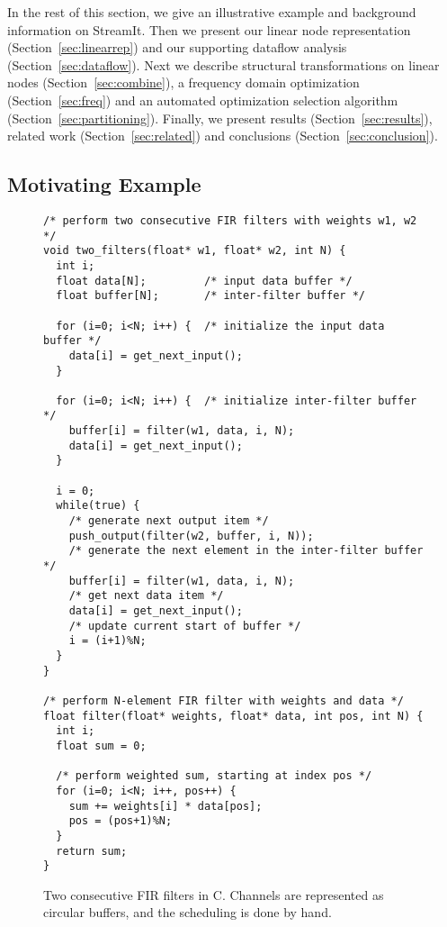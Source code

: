 In the rest of this section, we give an illustrative example and
background information on StreamIt.  Then we present our linear
node representation (Section~\ref{sec:linearrep}) and our 
supporting dataflow analysis (Section~\ref{sec:dataflow}).  
Next we describe structural transformations on linear nodes 
(Section~\ref{sec:combine}), a frequency domain optimization 
(Section~\ref{sec:freq}) and an automated optimization selection 
algorithm (Section~\ref{sec:partitioning}). Finally, we
present results (Section~\ref{sec:results}), related work
(Section~\ref{sec:related}) and conclusions
(Section~\ref{sec:conclusion}).

\subsection{Motivating Example}
\begin{figure}[t]
\vspace{-6pt}
\center
\epsfxsize=3.0in
\vspace{-5pt}
\caption{Block diagram of two FIR filters.}
\label{fig:motivating-fig}
\scriptsize
\begin{verbatim}
/* perform two consecutive FIR filters with weights w1, w2 */
void two_filters(float* w1, float* w2, int N) {
  int i;
  float data[N];         /* input data buffer */
  float buffer[N];       /* inter-filter buffer */
  
  for (i=0; i<N; i++) {  /* initialize the input data buffer */
    data[i] = get_next_input();
  }
  
  for (i=0; i<N; i++) {  /* initialize inter-filter buffer */
    buffer[i] = filter(w1, data, i, N);
    data[i] = get_next_input();
  }
  
  i = 0;
  while(true) {
    /* generate next output item */
    push_output(filter(w2, buffer, i, N));
    /* generate the next element in the inter-filter buffer */
    buffer[i] = filter(w1, data, i, N);
    /* get next data item */
    data[i] = get_next_input();
    /* update current start of buffer */
    i = (i+1)%N;
  }
}

/* perform N-element FIR filter with weights and data */
float filter(float* weights, float* data, int pos, int N) {
  int i;
  float sum = 0;

  /* perform weighted sum, starting at index pos */
  for (i=0; i<N; i++, pos++) {
    sum += weights[i] * data[pos];
    pos = (pos+1)%N;
  }
  return sum;
}
\end{verbatim}
\vspace{-18pt}
\caption{Two consecutive FIR filters in C.  Channels are represented
as circular buffers, and the scheduling is done by hand.
\protect\label{fig:motivating-example}}
\vspace{-12pt}
\end{figure}

